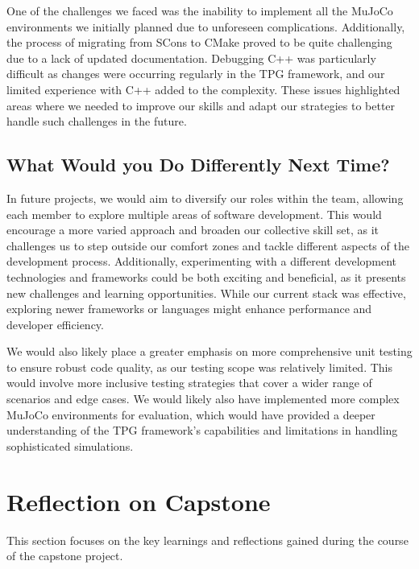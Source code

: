 \documentclass{article}
\begin{document}

One of the challenges we faced was the inability to implement all the MuJoCo environments we initially planned due to unforeseen complications. Additionally, the process of migrating from SCons to CMake proved to be quite challenging due to a lack of updated documentation. Debugging C++ was particularly difficult as changes were occurring regularly in the TPG framework, and our limited experience with C++ added to the complexity. These issues highlighted areas where we needed to improve our skills and adapt our strategies to better handle such challenges in the future.

\subsection{What Would you Do Differently Next Time?}


In future projects, we would aim to diversify our roles within the team, allowing each member to explore multiple areas of software development. This would encourage a more varied approach and broaden our collective skill set, as it challenges us to step outside our comfort zones and tackle different aspects of the development process. Additionally, experimenting with a different development technologies and frameworks could be both exciting and beneficial, as it presents new challenges and learning opportunities. While our current stack was effective, exploring newer frameworks or languages might enhance performance and developer efficiency.

We would also likely place a greater emphasis on more comprehensive unit testing to ensure robust code quality, as our testing scope was relatively limited. This would involve more inclusive testing strategies that cover a wider range of scenarios and edge cases. We would likely also have implemented more complex MuJoCo environments for evaluation, which would have provided a deeper understanding of the TPG framework's capabilities and limitations in handling sophisticated simulations.

\section{Reflection on Capstone}

This section focuses on the key learnings and reflections gained during the course of the capstone project.
\end{document}
